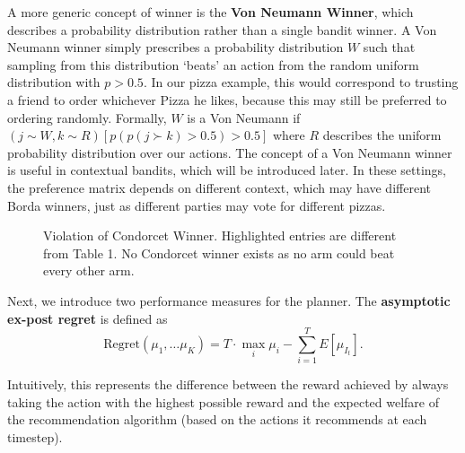 \documentclass[
  letterpaper,
  numbers=noenddot,
  DIV=11]{scrreprt}
\theoremstyle{plain}
\theoremstyle{definition}
\theoremstyle{remark}
\begin{document}
A more generic concept of winner is the \textbf{Von Neumann Winner},
which describes a probability distribution rather than a single bandit
winner. A Von Neumann winner simply prescribes a probability
distribution \(W\) such that sampling from this distribution `beats' an
action from the random uniform distribution with \(p > 0.5\). In our
pizza example, this would correspond to trusting a friend to order
whichever Pizza he likes, because this may still be preferred to
ordering randomly. Formally, \(W\) is a Von Neumann if
\((j \sim W, k \sim R) [p(p(j \succ k) > 0.5) > 0.5]\) where \(R\)
describes the uniform probability distribution over our actions. The
concept of a Von Neumann winner is useful in contextual bandits, which
will be introduced later. In these settings, the preference matrix
depends on different context, which may have different Borda winners,
just as different parties may vote for different pizzas.

\begin{figure}


\caption{\label{fig-condorcet_violation}Violation of Condorcet Winner.
Highlighted entries are different from Table 1. No Condorcet winner
exists as no arm could beat every other arm.}

\end{figure}%

Next, we introduce two performance measures for the planner. The
\textbf{asymptotic ex-post regret} is defined as
\[\text{Regret}(\mu_1, \ldots \mu_K) = T\cdot \max_i \mu_i - \sum_{i=1}^T E[\mu_{I_t}].\]

Intuitively, this represents the difference between the reward achieved
by always taking the action with the highest possible reward and the
expected welfare of the recommendation algorithm (based on the actions
it recommends at each timestep).
\end{document}
